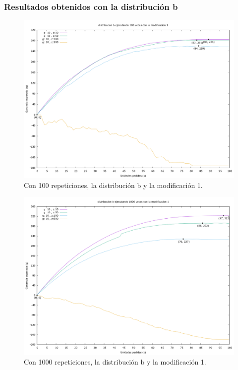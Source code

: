 \documentclass[12pt, spanish]{article}
\begin{document}
\subsubsection{Resultados obtenidos con la distribución b}



\begin{figure}[H]
	\centering
	\includegraphics[scale = 0.2]{prob_b/datos_b_100_1.png}
	\caption{Con 100 repeticiones, la distribución b y la modificación 1.}
	\label{fig:ej1_a_100}

\end{figure}

\begin{figure}[H]
	\centering
	\includegraphics[scale = 0.2]{prob_b/datos_b_1000_1.png}
	\caption{Con 1000 repeticiones, la distribución b y la modificación 1.}
	\label{fig:ej1_a_1000}

\end{figure}
\end{document}
